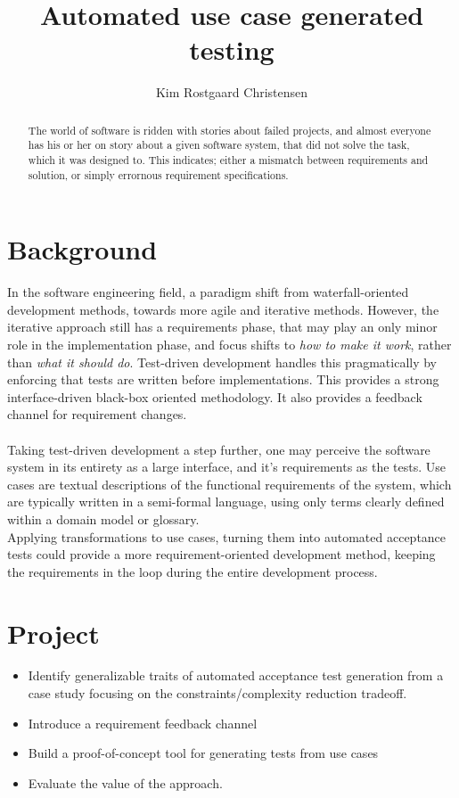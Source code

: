 \documentclass[10pt,a4paper,draft]{article}
\author{Kim Rostgaard Christensen}
\title{Automated use case generated testing}
\begin{document}
\maketitle
\begin{abstract}
The world of software is ridden with stories about failed projects, and almost everyone has his or her on story about a given software system, that did not solve the task, which it was designed to. This indicates; either a mismatch between requirements and solution, or simply errornous requirement specifications.
\end{abstract}

\section{Background}
In the software engineering field, a paradigm shift from waterfall-oriented development methods, towards more agile and iterative methods. However, the iterative approach still has a requirements phase, that may play an only minor role in the implementation phase, and focus shifts to \emph{how to make it work}, rather than \emph{what it should do}. Test-driven development handles this pragmatically by enforcing that tests are written before implementations. This provides a strong interface-driven black-box oriented methodology. It also provides a feedback channel for requirement changes.\\\\
Taking test-driven development a step further, one may perceive the software system in its entirety as a large interface, and it's requirements as the tests. Use cases are textual descriptions of the functional requirements of the system, which are typically written in a semi-formal language, using only terms clearly defined within a domain model or glossary.\\
Applying transformations to use cases, turning them into automated acceptance tests could provide a more requirement-oriented development method, keeping the requirements in the loop during the entire development process.

\section{Project}
\begin{itemize}
  \item Identify generalizable traits of automated acceptance test generation from a case study focusing on the constraints/complexity reduction tradeoff.
  \item Introduce a requirement feedback channel
  \item Build a proof-of-concept tool for generating tests from use cases
  \item Evaluate the value of the approach.
\end{itemize}

\end{document}
